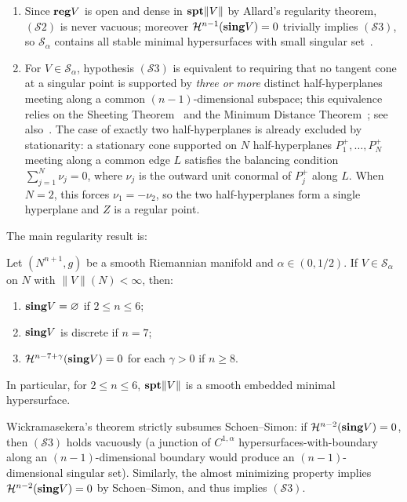 \begin{remark}\label{rem:S-alpha-remarks}
\begin{enumerate}[label=\textup{(\roman*)}]
    \item Since $\mathbf{reg} V$ is open and dense in $\mathbf{spt}\|V\|$ by Allard's regularity theorem, $(\mathcal{S}2)$ is never vacuous; moreover $\mathcal{H}^{n-1}(\mathbf{sing} V) = 0$ trivially implies $(\mathcal{S}3)$, so $\mathcal{S}_\alpha$ contains all stable minimal hypersurfaces with small singular set~\cite[Remarks~(1)--(2) following~$(\mathcal{S}3)$]{Wic14}.
    \item For $V \in \mathcal{S}_\alpha$, hypothesis $(\mathcal{S}3)$ is equivalent to requiring that no tangent cone at a singular point is supported by \emph{three or more} distinct half-hyperplanes meeting along a common $(n-1)$-dimensional subspace; this equivalence relies on the Sheeting Theorem~\cite[Theorem~3.3]{Wic14} and the Minimum Distance Theorem~\cite[Theorem~3.4]{Wic14}; see also~\cite[Remark~(3) following~$(\mathcal{S}3)$]{Wic14}. The case of exactly two half-hyperplanes is already excluded by stationarity: a stationary cone supported on $N$ half-hyperplanes $P_1^+, \ldots, P_N^+$ meeting along a common edge $L$ satisfies the balancing condition $\sum_{j=1}^N \nu_j = 0$, where $\nu_j$ is the outward unit conormal of $P_j^+$ along $L$. When $N = 2$, this forces $\nu_1 = -\nu_2$, so the two half-hyperplanes form a single hyperplane and $Z$ is a regular point.
\end{enumerate}
\end{remark}

The main regularity result is:

\begin{theorem}\label{thm:wickramasekera}
    Let $(N^{n+1}, g)$ be a smooth Riemannian manifold and $\alpha \in (0, 1/2)$. If $V \in \mathcal{S}_\alpha$ on $N$ with $\|V\|(N) < \infty$, then:
    \begin{enumerate}[label=\textup{(\alph*)}]
        \item $\mathbf{sing} V = \varnothing$ if $2 \leq n \leq 6$;
        \item $\mathbf{sing} V$ is discrete if $n = 7$;
        \item $\mathcal{H}^{n-7+\gamma}(\mathbf{sing} V) = 0$ for each $\gamma > 0$ if $n \geq 8$.
    \end{enumerate}
    In particular, for $2 \leq n \leq 6$, $\mathbf{spt}\|V\|$ is a smooth embedded minimal hypersurface.
\end{theorem}

Wickramasekera's theorem strictly subsumes Schoen--Simon: if $\mathcal{H}^{n-2}(\mathbf{sing} V) = 0$, then $(\mathcal{S}3)$ holds vacuously (a junction of $C^{1,\alpha}$ hypersurfaces-with-boundary along an $(n-1)$-dimensional boundary would produce an $(n-1)$-dimensional singular set). Similarly, the almost minimizing property implies $\mathcal{H}^{n-2}(\mathbf{sing} V) = 0$ by Schoen--Simon, and thus implies $(\mathcal{S}3)$.

